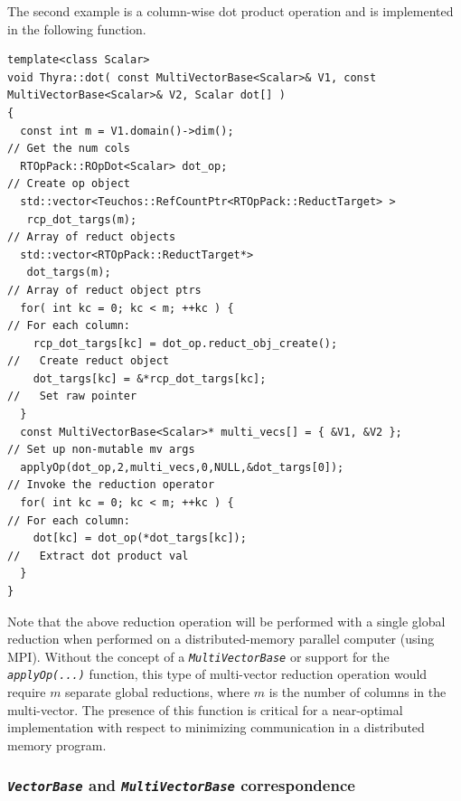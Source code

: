 \documentclass[pdf,ps2pdf,11pt]{SANDreport}
\begin{document}
The second example is a column-wise dot product operation and is
implemented in the following function.

{\scriptsize\begin{verbatim}
template<class Scalar>
void Thyra::dot( const MultiVectorBase<Scalar>& V1, const MultiVectorBase<Scalar>& V2, Scalar dot[] )
{
  const int m = V1.domain()->dim();                                      // Get the num cols
  RTOpPack::ROpDot<Scalar> dot_op;                                       // Create op object
  std::vector<Teuchos::RefCountPtr<RTOpPack::ReductTarget> >
   rcp_dot_targs(m);                                                     // Array of reduct objects
  std::vector<RTOpPack::ReductTarget*>
   dot_targs(m);                                                         // Array of reduct object ptrs
  for( int kc = 0; kc < m; ++kc ) {                                      // For each column:
    rcp_dot_targs[kc] = dot_op.reduct_obj_create();                      //   Create reduct object
    dot_targs[kc] = &*rcp_dot_targs[kc];                                 //   Set raw pointer
  }
  const MultiVectorBase<Scalar>* multi_vecs[] = { &V1, &V2 };            // Set up non-mutable mv args
  applyOp(dot_op,2,multi_vecs,0,NULL,&dot_targs[0]);                     // Invoke the reduction operator
  for( int kc = 0; kc < m; ++kc ) {                                      // For each column:
    dot[kc] = dot_op(*dot_targs[kc]);                                    //   Extract dot product val
  }
}
\end{verbatim}}

{}\noindent{}Note that the above reduction operation will be performed
with a single global reduction when performed on a distributed-memory
parallel computer (using MPI).  Without the concept of a
{}\texttt{\textit{Multi\-Vector\-Base}} or support for the
{}\texttt{\textit{applyOp(\-...)}} function, this type of multi-vector
reduction operation would require $m$ separate global reductions,
where $m$ is the number of columns in the multi-vector.  The presence
of this function is critical for a near-optimal implementation with
respect to minimizing communication in a distributed memory program.

%
\subsubsection{\texttt{\textit{Vector\-Base}} and {}\texttt{\textit{Multi\-Vector\-Base}} correspondence}
\label{tsfcore:sec:vector_vs_multivector}
%
\end{document}
